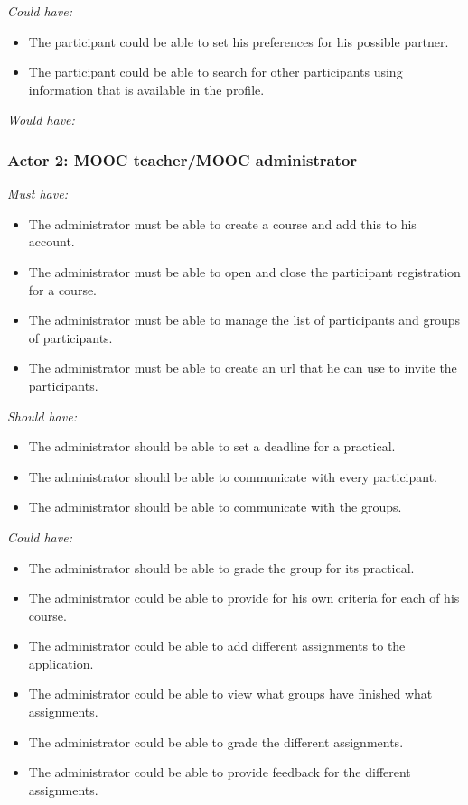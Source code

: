 \documentclass[]{article}
\newcommand{\reqr}[1]{{\noindent\emph{#1:}}}
\begin{document}
\reqr{Could have}
\begin{itemize}
\item The participant could be able to set his preferences for his possible partner.
\item The participant could be able to search for other participants using information that is available in the profile.
\end{itemize}

\reqr{Would have}


\subsubsection{Actor 2: MOOC teacher/MOOC administrator}
\reqr{Must have}
\begin{itemize}
\item The administrator must be able to create a course and add this to his account.
\item The administrator must be able to open and close the participant registration for a course.
\item The administrator must be able to manage the list of participants and groups of participants.
\item The administrator must be able to create an url that he can use to invite the participants.
\end{itemize}

\reqr{Should have}
\begin{itemize}
\item The administrator should be able to set a deadline for a practical.
\item The administrator should be able to communicate with every participant.
\item The administrator should be able to communicate with the groups.
\end{itemize}

\reqr{Could have}
\begin{itemize}
\item The administrator should be able to grade the group for its practical.
\item The administrator could be able to provide for his own criteria for each of his course.
\item The administrator could be able to add different assignments to the application.
\item The administrator could be able to view what groups have finished what assignments.
\item The administrator could be able to grade the different assignments.
\item The administrator could be able to provide feedback for the different assignments.
\end{itemize}
\end{document}
